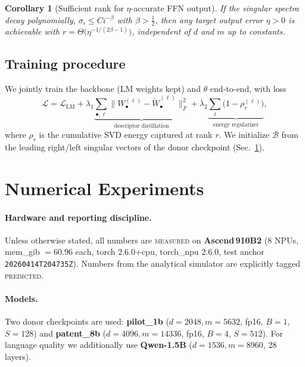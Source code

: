 \documentclass[11pt]{article}
\newtheorem{corollary}{Corollary}
\theoremstyle{definition}
\newcommand{\norm}[1]{\lVert #1 \rVert}
\newcommand{\Loss}{\mathcal{L}}
\begin{document}
\begin{corollary}[Sufficient rank for $\eta$-accurate FFN output]\label{cor:rank}
If the singular spectra decay polynomially, $\sigma_i\le C i^{-\beta}$ with $\beta>\tfrac12$, then any target output error $\eta>0$ is achievable with $r=\Theta\big(\eta^{-1/(2\beta-1)}\big)$, independent of $d$ and $m$ up to constants.
\end{corollary}

\subsection{Training procedure}

We jointly train the backbone (LM weights kept) and $\theta$ end-to-end, with loss
\begin{equation}
\Loss = \Loss_{\text{LM}} + \lambda_1 \underbrace{\sum_{\bullet,\ell}\norm{W_\bullet^{(\ell)}-\widetilde W_\bullet^{(\ell)}}_F^2}_{\text{descriptor distillation}} + \lambda_2\underbrace{\sum_\ell\big(1-\rho_r^{(\ell)}\big)}_{\text{energy regularizer}},
\end{equation}
where $\rho_r$ is the cumulative SVD energy captured at rank $r$. We initialize $\mathcal{B}$ from the leading right/left singular vectors of the donor checkpoint (Sec.~\ref{sec:experiments}).

\section{Numerical Experiments}
\label{sec:experiments}

\paragraph{Hardware and reporting discipline.}
Unless otherwise stated, all numbers are \textsc{measured} on \textbf{Ascend\,910B2} (8 NPUs, mem\_gib $=60.96$ each, torch $2.6.0$+cpu, torch\_npu $2.6.0$, test anchor \texttt{20260414T204735Z}). Numbers from the analytical simulator are explicitly tagged \textsc{predicted}.

\paragraph{Models.}
Two donor checkpoints are used:
\textbf{pilot\_1b} ($d{=}2048,m{=}5632$, fp16, $B{=}1$, $S{=}128$) and
\textbf{patent\_8b} ($d{=}4096,m{=}14336$, fp16, $B{=}4$, $S{=}512$).
For language quality we additionally use \textbf{Qwen-1.5B} ($d{=}1536,m{=}8960$, 28 layers).
\end{document}
